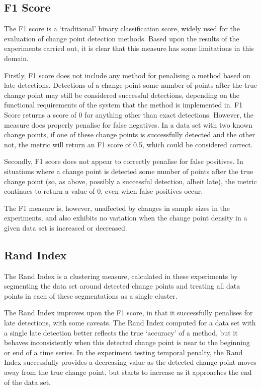 \documentclass[../main.tex]{subfiles}
\begin{document}
\subsection{F1 Score}

The F1 score is a `traditional' binary classification score, widely used for the evaluation of change point detection methods. Based upon the results of the experiments carried out, it is clear that this measure has some limitations in this domain.

Firstly, F1 score does not include any method for penalising a method based on late detections. Detections of a change point some number of points after the true change point may still be considered successful detections, depending on the functional requirements of the system that the method is implemented in. F1 Score returns a score of 0 for anything other than exact detections. However, the measure does properly penalise for false negatives. In a data set with two known change points, if one of these change points is successfully detected and the other not, the metric will return an F1 score of 0.5, which could be considered correct.

Secondly, F1 score does not appear to correctly penalise for false positives. In situations where a change point is detected some number of points after the true change point (so, as above, possibly a successful detection, albeit late), the metric continues to return a value of 0, even when false positives occur.

The F1 measure is, however, unaffected by changes in sample sizes in the experiments, and also exhibits no variation when the change point density in a given data set is increased or decreased.

\subsection{Rand Index}

The Rand Index is a clustering measure, calculated in these experiments by segmenting the data set around detected change points and treating all data points in each of these segmentations as a single cluster.

The Rand Index improves upon the F1 score, in that it successfully penalises for late detections, with some caveats. The Rand Index computed for a data set with a single late detection better reflects the true `accuracy' of a method, but it behaves inconsistently when this detected change point is near to the beginning or end of a time series. In the experiment testing temporal penalty, the Rand Index successfully provides a decreasing value as the detected change point moves away from the true change point, but starts to increase as it approaches the end of the data set.
\end{document}
